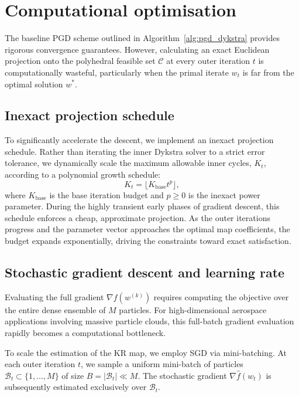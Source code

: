 \section{Computational optimisation}
\label{sec:optimisation}

The baseline PGD scheme outlined in Algorithm~\ref{alg:pgd_dykstra} provides rigorous convergence guarantees. However, calculating an exact Euclidean projection onto the polyhedral feasible set $\mathcal{C}$ at every outer iteration $t$ is computationally wasteful, particularly when the primal iterate $w_t$ is far from the optimal solution $w^*$. 

\subsection{Inexact projection schedule}

To significantly accelerate the descent, we implement an inexact projection schedule. Rather than iterating the inner Dykstra solver to a strict error tolerance, we dynamically scale the maximum allowable inner cycles, $K_t$, according to a polynomial growth schedule:
$$K_t = \lfloor K_{\text{base}} t^p \rfloor,$$
where $K_{\text{base}}$ is the base iteration budget and $p \ge 0$ is the inexact power parameter. During the highly transient early phases of gradient descent, this schedule enforces a cheap, approximate projection. As the outer iterations progress and the parameter vector approaches the optimal map coefficients, the budget expands exponentially, driving the constraints toward exact satisfaction.

\subsection{Stochastic gradient descent and learning rate}

Evaluating the full gradient $\nabla f(w^{(k)})$ requires computing the objective over the entire dense ensemble of $M$ particles. For high-dimensional aerospace applications involving massive particle clouds, this full-batch gradient evaluation rapidly becomes a computational bottleneck.

To scale the estimation of the KR map, we employ SGD via mini-batching. At each outer iteration $t$, we sample a uniform mini-batch of particles $\mathcal{B}_t \subset \{1, \dots, M\}$ of size $B = |\mathcal{B}_t| \ll M$. The stochastic gradient $\nabla \hat{f}(w_t)$ is subsequently estimated exclusively over $\mathcal{B}_t$. 

